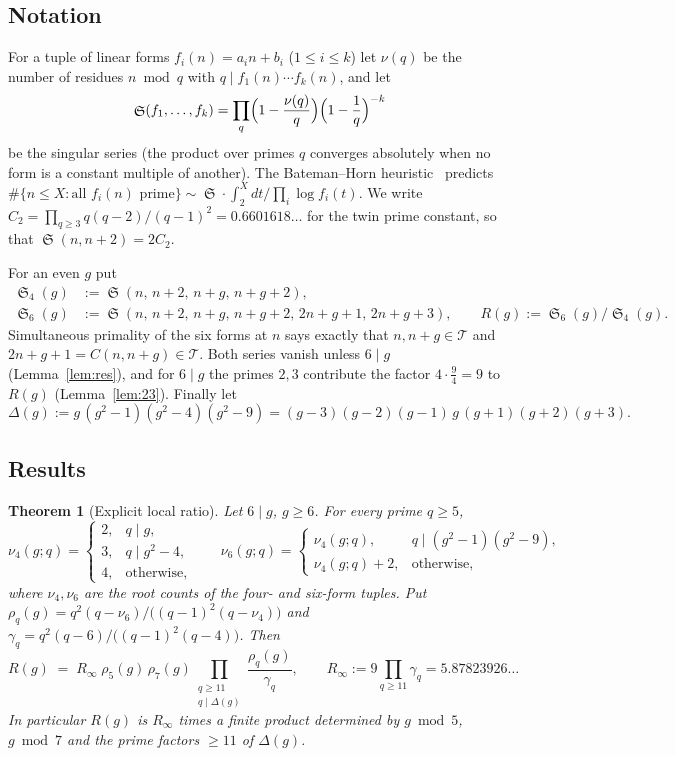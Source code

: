 \documentclass[11pt,a4paper]{article}
\theoremstyle{plain}
\newtheorem{theorem}{Theorem}[section]
\theoremstyle{definition}
\theoremstyle{remark}
\newcommand{\Tset}{\mathcal{T}}
\newcommand{\Rinf}{R_{\infty}}
\DeclareMathOperator{\Sing}{\mathfrak S}
\begin{document}
\subsection*{Notation}
For a tuple of linear forms $f_i(n)=a_in+b_i$ ($1\le i\le k$) let
$\nu(q)$ be the number of residues $n\bmod q$ with
$q\mid f_1(n)\cdots f_k(n)$, and let
\begin{equation}\label{eq:sing}
\Sing(f_1,\dots,f_k)=\prod_{q}\Bigl(1-\frac{\nu(q)}q\Bigr)\Bigl(1-\frac1q\Bigr)^{-k}
\end{equation}
be the singular series (the product over primes $q$ converges absolutely
when no form is a constant multiple of another).  The Bateman--Horn
heuristic~\cite{BH} predicts
$\#\{n\le X: \text{all } f_i(n)\text{ prime}\}\sim
\Sing\cdot\int_2^X dt/\prod_i\log f_i(t)$.
We write $C_2=\prod_{q\ge3}q(q-2)/(q-1)^2=0.6601618\ldots$ for the twin
prime constant, so that $\Sing(n,n+2)=2C_2$.

For an even $g$ put
\begin{align*}
\Sing_4(g)&:=\Sing(n,\,n+2,\,n+g,\,n+g+2),\\
\Sing_6(g)&:=\Sing(n,\,n+2,\,n+g,\,n+g+2,\,2n+g+1,\,2n+g+3),\qquad
R(g):=\Sing_6(g)/\Sing_4(g).
\end{align*}
Simultaneous primality of the six forms at $n$ says exactly that
$n,n+g\in\Tset$ and $2n+g+1=C(n,n+g)\in\Tset$.  Both series vanish unless
$6\mid g$ (Lemma~\ref{lem:res}), and for $6\mid g$ the primes $2,3$
contribute the factor $4\cdot\frac94=9$ to $R(g)$ (Lemma~\ref{lem:23}).
Finally let
\[
\Delta(g):=g\,(g^2-1)(g^2-4)(g^2-9)=(g-3)(g-2)(g-1)\,g\,(g+1)(g+2)(g+3).
\]

\subsection*{Results}

\begin{theorem}[Explicit local ratio]\label{thm:explicit}
Let $6\mid g$, $g\ge6$.  For every prime $q\ge5$,
\[
\nu_4(g;q)=\begin{cases}2,& q\mid g,\\ 3,& q\mid g^2-4,\\ 4,&\text{otherwise},\end{cases}
\qquad
\nu_6(g;q)=\begin{cases}\nu_4(g;q),& q\mid (g^2-1)(g^2-9),\\ \nu_4(g;q)+2,&\text{otherwise},\end{cases}
\]
where $\nu_4,\nu_6$ are the root counts of the four- and six-form tuples.
Put $\rho_q(g)=q^2(q-\nu_6)/\bigl((q-1)^2(q-\nu_4)\bigr)$ and
$\gamma_q=q^2(q-6)/\bigl((q-1)^2(q-4)\bigr)$.  Then
\begin{equation}\label{eq:explicit}
R(g)\;=\;\Rinf\;\rho_5(g)\,\rho_7(g)\prod_{\substack{q\ge 11\\ q\mid\Delta(g)}}\frac{\rho_q(g)}{\gamma_q},
\qquad
\Rinf:=9\prod_{q\ge11}\gamma_q=5.87823926\ldots
\end{equation}
In particular $R(g)$ is $\Rinf$ times a finite product determined by
$g\bmod 5$, $g\bmod 7$ and the prime factors $\ge11$ of $\Delta(g)$.
\end{theorem}
\end{document}
